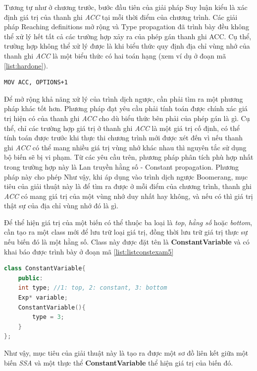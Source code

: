 Tương tự như ở chương trước, bước đầu tiên của giải pháp Suy luận kiểu là xác định giá trị của thanh ghi \textit{ACC} tại mỗi thời điểm của chương trình. Các giải pháp Reaching definitions mở rộng và Type propagation đã trình bày đều không thể xử lý hết tất cả các trường hợp xảy ra của phép gán thanh ghi ACC. Cụ thể, trường hợp không thể xử lý được là khi biểu thức quy định địa chỉ vùng nhớ của thanh ghi \textit{ACC} là một biểu thức có hai toán hạng (xem ví dụ ở đoạn mã \ref{list:hardone}). 
\begin{lstlisting}[caption={Trường hợp không thể xử lý được bằng các phương pháp phân tích dữ liệu trước},label={list:hardone}]
MOV ACC, OPTIONS+1
\end{lstlisting}
Để mở rộng khả năng xử lý của trình dịch ngược, cần phải tìm ra một phương pháp khác tốt hơn. Phương pháp đạt yêu cầu phải tính toán được chính xác giá trị hiện có của thanh ghi \textit{ACC} cho dù biểu thức bên phải của phép gán là gì. Cụ thể, chỉ các trường hợp giá trị ở thanh ghi \textit{ACC} là một giá trị cố định, có thể tính toán được trước khi thực thi chương trình mới được xét đến vì nếu thanh ghi \textit{ACC} có thể mang nhiều giá trị vùng nhớ khác nhau thì nguyên tắc sử dụng bộ biến sẽ bị vi phạm. Từ các yêu cầu trên, phương pháp phân tích phù hợp nhất trong trường hợp này là Lan truyền hằng số - Constant propagation. Phương pháp này cho phép 
Như vậy, khi áp dụng vào trình dịch ngược Boomerang, mục tiêu của giải thuật này là để tìm ra được ở mỗi điểm của chương trình, thanh ghi \textit{ACC} có mang giá trị của một vùng nhớ duy nhất hay không, và nếu có thì giá trị thật sự của địa chỉ vùng nhớ đó là gì.


Để thể hiện giá trị của một biến có thể thuộc ba loại là \textit{top}, \textit{hằng số} hoặc \textit{bottom}, cần tạo ra một class mới để lưu trữ loại giá trị, đồng thời lưu trữ giá trị thực sự nếu biến đó là một hằng số. Class này được đặt tên là \textbf{ConstantVariable} và có khai báo được trình bày ở đoạn mã \ref{list:listconstexam5}
\begin{lstlisting}[caption={Đoạn mã thể hiện class ConstantVariable},label={list:listconstexam5}, language=c++]
class ConstantVariable{
	public:
	int type; //1: top, 2: constant, 3: bottom
	Exp* variable;
	ConstantVariable(){
		type = 3;
	}
};
\end{lstlisting}
Như vậy, mục tiêu của giải thuật này là tạo ra được một sơ đồ liên kết giữa một biến \textit{SSA} và một thực thể \textbf{ConstantVariable} thể hiện giá trị của biến đó. \\

